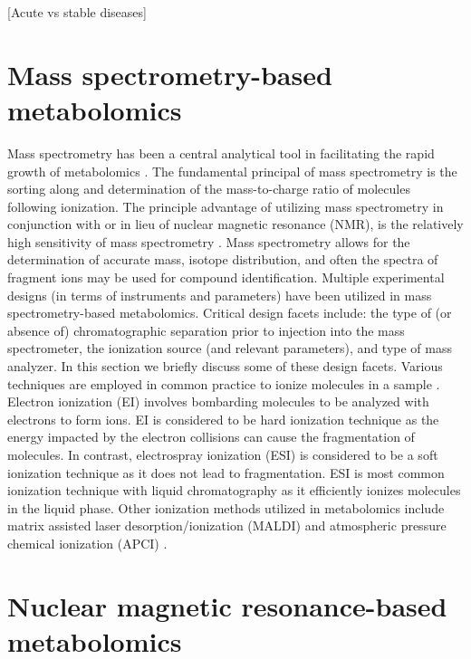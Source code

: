 \begin{DoubleSpace*}
 \cite{johnson2016}

[Acute vs stable diseases]

\section{Mass spectrometry-based metabolomics}
Mass spectrometry has been a central analytical tool in facilitating the rapid growth of metabolomics \cite{dunn2013}. The fundamental principal of mass spectrometry is the sorting along and determination of the mass-to-charge ratio of molecules following ionization. The principle advantage of utilizing mass spectrometry in conjunction with or in lieu of nuclear magnetic resonance (NMR), is the relatively high sensitivity of mass spectrometry \cite{sumner2011,gowda2014,jurgen2017}. Mass spectrometry allows for the determination of accurate mass, isotope distribution, and often the spectra of fragment ions may be used for compound identification. Multiple experimental designs (in terms of instruments and parameters) have been utilized in mass spectrometry-based metabolomics. Critical design facets include: the type of (or absence of) chromatographic separation prior to injection into the mass spectrometer, the ionization source (and relevant parameters), and type of mass analyzer. In this section we briefly discuss some of these design facets. Various techniques are employed in common practice to ionize molecules in a sample \cite{sumner2011,gowda2014,jurgen2017}. Electron ionization (EI) involves bombarding molecules to be analyzed with electrons to form ions. EI is considered to be hard ionization technique as the energy impacted by the electron collisions can cause the fragmentation of molecules. In contrast, electrospray ionization (ESI) is considered to be a soft ionization technique as it does not lead to fragmentation. ESI is most common ionization technique with liquid chromatography as it efficiently ionizes molecules in the liquid phase. Other ionization methods utilized in metabolomics include matrix assisted laser desorption/ionization (MALDI) and atmospheric pressure chemical ionization (APCI) \cite{sumner2011}.

\section{Nuclear magnetic resonance-based metabolomics}
\cite{gowda2016}
\cite{dona2016}
\cite{markley2017}

\end{DoubleSpace*}